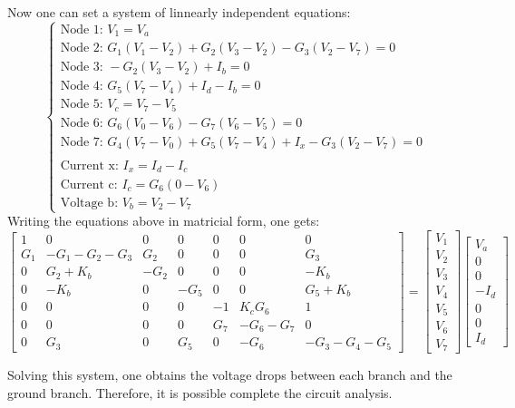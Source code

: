 Now one can set a system of linnearly independent equations:
$$
\begin{cases}
  \text{Node 1: } V_{1} = V_{a}\\
  \text{Node 2: } G_{1}(V_{1}-V_{2})+G_{2}(V_{3}-V_{2})-G_{3}(V_{2}-V_{7}) = 0\\
  \text{Node 3: } -G_{2}(V_{3}-V_{2})+I_{b} = 0\\
  \text{Node 4: } G_{5}(V_{7}-V_{4})+I_{d}-I_{b} = 0\\
  \text{Node 5: } V_{c}=V_{7}-V_{5}\\
  \text{Node 6: } G_{6}(V_{0}-V_{6})-G_{7}(V_{6}-V_{5}) = 0\\
  \text{Node 7: } G_{4}(V_{7}-V_{0})+G_{5}(V_{7}-V_{4})+I_{x}-G_{3}(V_{2}-V_{7}) = 0\\
  \\
  \text{Current x: } I_{x} = I_{d}-I_{c}\\
  \text{Current c: } I_{c} = G_{6}(0-V_{6})\\
  \text{Voltage b: } V_{b} = V_{2}-V_{7}
\end{cases}
$$
Writing the equations above in matricial form, one gets:
$$
\begin{bmatrix}
  1 & 0 & 0 & 0 & 0 & 0 & 0\\
  G_{1} & -G_{1}-G_{2}-G_{3} & G_{2} & 0 & 0 & 0 & G_{3}\\
  0 & G_{2}+K_{b} & -G_{2} & 0 & 0 & 0 & -K_{b}\\
  0 & -K_{b} & 0 & -G_{5} & 0 & 0 & G_{5}+K_{b}\\
  0 & 0 & 0 & 0 & -1 & K_{c}G_{6} & 1\\
  0 & 0 & 0 & 0 & G_{7} & -G_{6}-G_{7} & 0\\
  0 & G_{3} & 0 & G_{5} & 0 & -G_{6} & -G_{3}-G_{4}-G_{5}
\end{bmatrix}
=
\begin{bmatrix}
  V_{1}\\
  V_{2}\\
  V_{3}\\
  V_{4}\\
  V_{5}\\
  V_{6}\\
  V_{7}
\end{bmatrix}
\begin{bmatrix}
  V_{a}\\
  0\\
  0\\
  -I_{d}\\
  0\\
  0\\
  I_{d}
\end{bmatrix}
$$\par
Solving this system, one obtains the voltage drops between each branch and the ground branch. Therefore, it is possible complete the circuit analysis.

